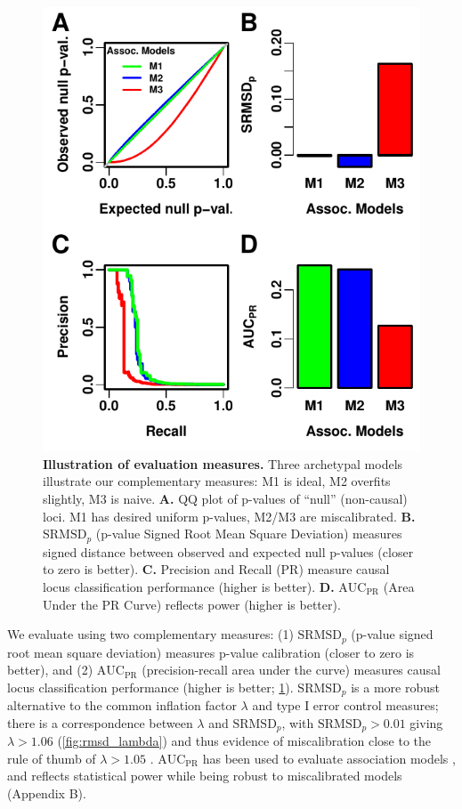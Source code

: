 \documentclass[11pt]{article}
\newcommand{\rmsd}{\text{SRMSD}_p}
\newcommand{\auc}{\text{AUC}_\text{PR}}
\begin{document}
\begin{linenumbers}
\begin{figure}[hp]
  \centering
  \includegraphics{sim-n1000-k10-f0.1-s0.5-g1/measures-illustration.pdf}
  \caption{
    {\bf Illustration of evaluation measures.}
    Three archetypal models illustrate our complementary measures:
    M1 is ideal, M2 overfits slightly, M3 is naive.
    \textbf{A.}
    QQ plot of p-values of ``null'' (non-causal) loci.
    M1 has desired uniform p-values, M2/M3 are miscalibrated.
    \textbf{B.}
    $\rmsd$ (p-value Signed Root Mean Square Deviation) measures signed distance between observed and expected null p-values (closer to zero is better).
    \textbf{C.}
    Precision and Recall (PR) measure causal locus classification performance (higher is better).
    \textbf{D.}
    $\auc$ (Area Under the PR Curve) reflects power (higher is better).
  }
  \label{fig:measures_illustration}
\end{figure}

We evaluate using two complementary measures:
(1) $\rmsd$ (p-value signed root mean square deviation) measures p-value calibration (closer to zero is better), and
(2) $\auc$ (precision-recall area under the curve) measures causal locus classification performance (higher is better; \cref{fig:measures_illustration}).
$\rmsd$ is a more robust alternative to the common inflation factor $\lambda$ and type I error control measures; there is a correspondence between $\lambda$ and $\rmsd$, with $\rmsd > 0.01$ giving $\lambda > 1.06$ (\cref{fig:rmsd_lambda}) and thus evidence of miscalibration close to the rule of thumb of $\lambda > 1.05$ \citep{price_new_2010}.
$\auc$ has been used to evaluate association models \citep{rakitsch_lasso_2013}, and reflects statistical power while being robust to miscalibrated models (Appendix B).


\end{linenumbers}
\end{document}
